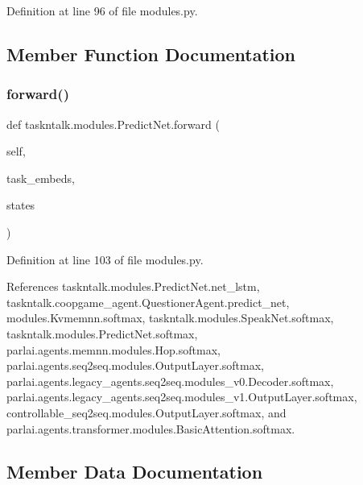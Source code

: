 Definition at line 96 of file modules.\+py.



\subsection{Member Function Documentation}
\mbox{\label{classtaskntalk_1_1modules_1_1PredictNet_a4adb776b0030568ee90c3f8938990d27}} 
\subsubsection{\texorpdfstring{forward()}{forward()}}
{\footnotesize\ttfamily def taskntalk.\+modules.\+Predict\+Net.\+forward (\begin{DoxyParamCaption}\item[{}]{self,  }\item[{}]{task\+\_\+embeds,  }\item[{}]{states }\end{DoxyParamCaption})}



Definition at line 103 of file modules.\+py.



References taskntalk.\+modules.\+Predict\+Net.\+net\+\_\+lstm, taskntalk.\+coopgame\+\_\+agent.\+Questioner\+Agent.\+predict\+\_\+net, modules.\+Kvmemnn.\+softmax, taskntalk.\+modules.\+Speak\+Net.\+softmax, taskntalk.\+modules.\+Predict\+Net.\+softmax, parlai.\+agents.\+memnn.\+modules.\+Hop.\+softmax, parlai.\+agents.\+seq2seq.\+modules.\+Output\+Layer.\+softmax, parlai.\+agents.\+legacy\+\_\+agents.\+seq2seq.\+modules\+\_\+v0.\+Decoder.\+softmax, parlai.\+agents.\+legacy\+\_\+agents.\+seq2seq.\+modules\+\_\+v1.\+Output\+Layer.\+softmax, controllable\+\_\+seq2seq.\+modules.\+Output\+Layer.\+softmax, and parlai.\+agents.\+transformer.\+modules.\+Basic\+Attention.\+softmax.



\subsection{Member Data Documentation}
\mbox{\label{classtaskntalk_1_1modules_1_1PredictNet_af007e09bd94e06d3d34ebfe74b43fac0}} 
